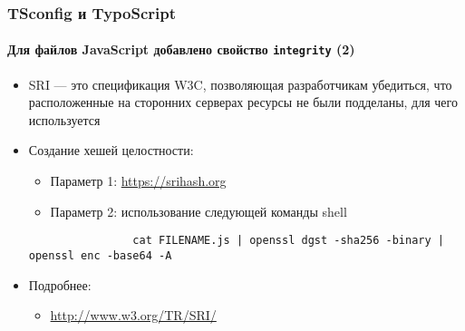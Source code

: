 \begin{frame}[fragile]
	\frametitle{TSconfig и TypoScript}
	\framesubtitle{Для файлов JavaScript добавлено свойство \texttt{integrity} (2)}


	\begin{itemize}

		\item SRI — это спецификация W3C, позволяющая разработчикам убедиться, что
			расположенные на сторонних серверах ресурсы не были подделаны, для чего используется

		\item Создание хешей целостности:

			\begin{itemize}
				\item Параметр 1: \url{https://srihash.org}
				\item Параметр 2: использование следующей команды shell
			\end{itemize}

			\begin{lstlisting}
				cat FILENAME.js | openssl dgst -sha256 -binary | openssl enc -base64 -A
			\end{lstlisting}

		\item Подробнее:

			\begin{itemize}
				\item \url{http://www.w3.org/TR/SRI/}
			\end{itemize}

	\end{itemize}

\end{frame}

